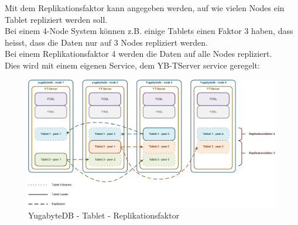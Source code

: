 \begin{flushleft}
    Mit dem Replikationsfaktor  kann angegeben werden, auf wie vielen Nodes ein Tablet repliziert werden soll.\\
    Bei einem 4-Node System können z.B. einige Tablets einen Faktor 3 haben, dass heisst, dass die Daten nur auf 3 Nodes repliziert werden.\\
    Bei einem Replikationsfaktor 4 werden die Daten auf alle Nodes repliziert.\\
    Dies wird mit einem eigenen Service, dem YB-TServer service \cite{RSV64WED} geregelt:
    \begin{figure}[H]
        \centering
        \includegraphics[width=0.8\linewidth]{source/implementation/evaluation/postgresql_ha_solutions/yugabytedb/yugabytedb-tablet-replication-factor}
        \caption{YugabyteDB - Tablet - Replikationsfaktor}
        \label{fig:yugabytedb-tablet-replication-factor}
    \end{figure}
\end{flushleft}
\begin{flushleft}
    \end{flushleft}

